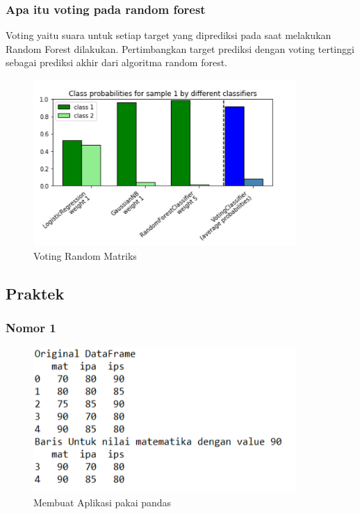\subsubsection{Apa itu voting pada random forest}

\hfill\break
Voting yaitu suara untuk setiap target yang diprediksi pada saat melakukan Random Forest dilakukan. Pertimbangkan target prediksi dengan voting tertinggi sebagai prediksi akhir dari algoritma random forest.

\begin{figure}[H]
\centerline{\includegraphics[width=10cm]{figures/1174084/3/3.png}}
\caption{Voting Random Matriks}
\label{labelgambar}
\end{figure}


\subsection{Praktek}
\subsubsection{Nomor 1}
\hfill\break

\begin{figure}[H]
\centerline{\includegraphics[width=10cm]{figures/1174084/3/4.png}}
\caption{Membuat Aplikasi pakai pandas}
\label{labelgambar}
\end{figure}

